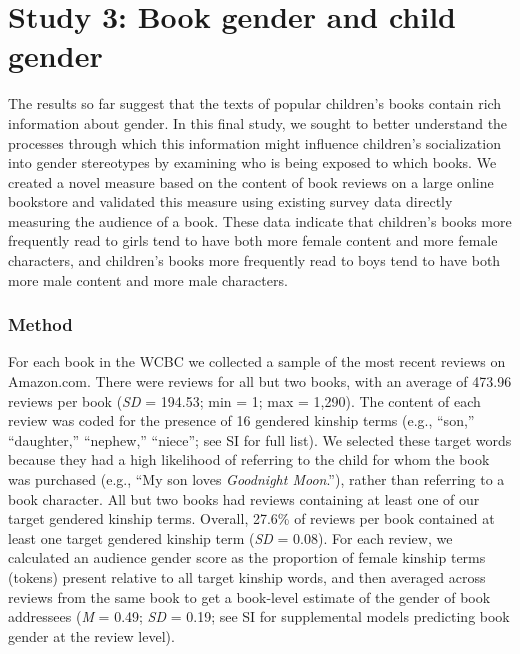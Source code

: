 \documentclass[
  english,
  ,man,floatsintext]{apa6}
\begin{document}
\hypertarget{study-3-book-gender-and-child-gender}{%
\section{Study 3: Book gender and child gender}\label{study-3-book-gender-and-child-gender}}

The results so far suggest that the texts of popular children's books contain rich information about gender. In this final study, we sought to better understand the processes through which this information might influence children's socialization into gender stereotypes by examining who is being exposed to which books. We created a novel measure based on the content of book reviews on a large online bookstore and validated this measure using existing survey data directly measuring the audience of a book. These data indicate that children's books more frequently read to girls tend to have both more female content and more female characters, and children's books more frequently read to boys tend to have both more male content and more male characters.

\hypertarget{method-3}{%
\subsubsection{Method}\label{method-3}}

For each book in the WCBC we collected a sample of the most recent reviews on Amazon.com. There were reviews for all but two books, with an average of 473.96 reviews per book (\emph{SD} = 194.53; min = 1; max = 1,290). The content of each review was coded for the presence of 16 gendered kinship terms (e.g., ``son,'' ``daughter,'' ``nephew,'' ``niece''; see SI for full list). We selected these target words because they had a high likelihood of referring to the child for whom the book was purchased (e.g., ``My son loves \emph{Goodnight Moon}.''), rather than referring to a book character. All but two books had reviews containing at least one of our target gendered kinship terms. Overall, 27.6\% of reviews per book contained at least one target gendered kinship term (\emph{SD} = 0.08). For each review, we calculated an audience gender score as the proportion of female kinship terms (tokens) present relative to all target kinship words, and then averaged across reviews from the same book to get a book-level estimate of the gender of book addressees (\emph{M} = 0.49; \emph{SD} = 0.19; see SI for supplemental models predicting book gender at the review level).
\end{document}
